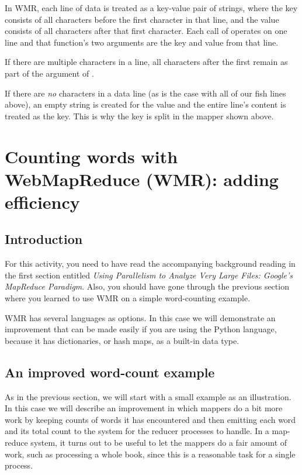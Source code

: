 \documentclass[letterpaper,10pt,openany,oneside]{sphinxmanual}
\begin{document}
In WMR, each line of data is treated as a key-value pair of
strings, where the key consists of all characters before the first
 character in that line, and the value consists of all
characters after that first  character. Each call of
 operates on one line and that function's two arguments
are the key and value from that line.

If there are multiple  characters in a line, all 
characters after the first remain as part of the  argument
of .

If there are \emph{no}  characters in a data line (as is the case
with all of our fish lines above), an empty string is created for
the value and the entire line's content is treated as the key. This
is why the key is split in the mapper shown above.


\chapter{Counting words with WebMapReduce (WMR): adding efficiency}
\label{wmr_py/wmr_py:counting-words-with-webmapreduce-wmr-adding-efficiency}\label{wmr_py/wmr_py::doc}

\section{Introduction}
\label{wmr_py/wmr_py:introduction}
For this activity, you need to have read the accompanying
background reading in the first section entitled
\emph{Using Parallelism to Analyze Very Large Files: Google's MapReduce Paradigm}.
Also, you should have gone through the previous section
where you learned to use WMR on a simple word-counting example.

WMR has several languages as options.  In this case we will
demonstrate an improvement that can be made easily if you are using
the Python language, because it has dictionaries, or hash maps,
as a built-in data type.


\section{An improved word-count example}
\label{wmr_py/wmr_py:an-improved-word-count-example}
As in the previous section, we will start with a small example
as an illustration.  In this case we will describe an improvement in
which mappers do a bit more work by keeping counts of words it has
encountered and then emitting each word and its total count to
the system for the reducer processes to handle.  In a map-reduce system,
it turns out to be useful to let the mappers do a fair amount of work,
such as processing a whole book, since this is a reasonable task
for a single process.
\end{document}
